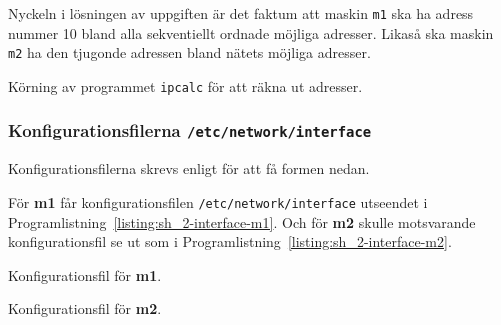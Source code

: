 Nyckeln i lösningen av uppgiften är det faktum att maskin \texttt{m1} ska ha
adress nummer 10 bland alla sekventiellt ordnade möjliga adresser. Likaså ska
maskin \texttt{m2} ha den tjugonde adressen bland nätets möjliga adresser.

\begin{listing}[H]
  \caption{Körning av programmet \texttt{ipcalc} för att räkna ut adresser.}
  \label{listing:sh_2-ipcalc}
\end{listing}




\subsubsection{Konfigurationsfilerna \texttt{/etc/network/interface}}
Konfigurationsfilerna skrevs enligt \cite{debian:network} för att få formen
nedan.

För \textbf{m1} får konfigurationsfilen \texttt{/etc/network/interface}
utseendet i Programlistning~\ref{listing:sh_2-interface-m1}.  Och för
\textbf{m2} skulle motsvarande konfigurationsfil se ut som i
Programlistning~\ref{listing:sh_2-interface-m2}.


\begin{listing}[H]
  \caption{Konfigurationsfil för \textbf{m1}.}
  \label{listing:sh_2-interface-m1}
\end{listing}

\begin{listing}[H]
  \caption{Konfigurationsfil för \textbf{m2}.}
  \label{listing:sh_2-interface-m2}
\end{listing}
